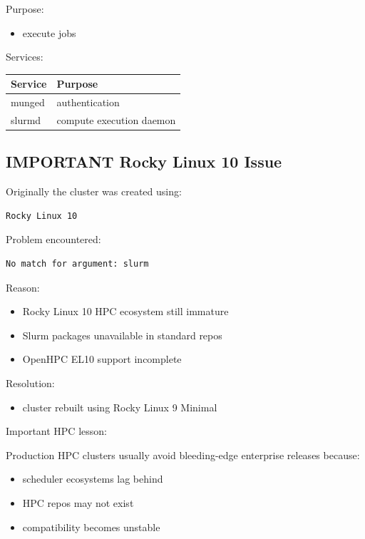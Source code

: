 \documentclass[11pt]{article}
\begin{document}
\begin{enumerate}
Purpose:

\begin{itemize}
\item execute jobs
\end{itemize}

Services:

\begin{center}
\begin{tabular}{ll}
Service & Purpose\\
\hline
munged & authentication\\
slurmd & compute execution daemon\\
\end{tabular}
\end{center}
\end{enumerate}
\subsection{IMPORTANT Rocky Linux 10 Issue}
\label{sec:org7d2337c}

Originally the cluster was created using:

\begin{verbatim}
Rocky Linux 10
\end{verbatim}

Problem encountered:

\begin{verbatim}
No match for argument: slurm
\end{verbatim}

Reason:

\begin{itemize}
\item Rocky Linux 10 HPC ecosystem still immature
\item Slurm packages unavailable in standard repos
\item OpenHPC EL10 support incomplete
\end{itemize}

Resolution:

\begin{itemize}
\item cluster rebuilt using Rocky Linux 9 Minimal
\end{itemize}

Important HPC lesson:

Production HPC clusters usually avoid bleeding-edge enterprise releases because:

\begin{itemize}
\item scheduler ecosystems lag behind
\item HPC repos may not exist
\item compatibility becomes unstable
\end{itemize}
\end{document}
